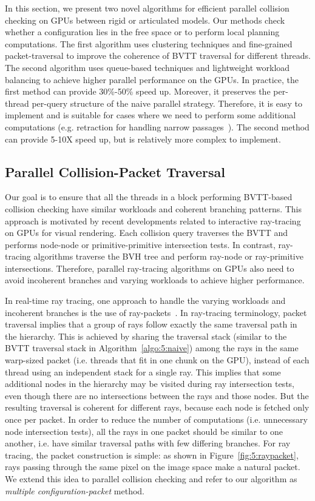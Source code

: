 In this section, we present two novel algorithms for efficient parallel collision checking on GPUs between rigid or articulated models. Our methods check whether a configuration lies in the free space or to perform local planning computations. The first algorithm uses clustering techniques and fine-grained packet-traversal to improve the
coherence of BVTT traversal for different threads. The second algorithm uses queue-based techniques and lightweight workload
balancing to achieve higher parallel performance on the GPUs. In practice, the first method can provide 30\%-50\% speed up.
Moreover, it preserves the per-thread per-query structure of the naive parallel strategy. Therefore, it is easy to implement
and is suitable for cases where we need to perform some additional computations (e.g. retraction for handling narrow passages~\cite{Zhang08-ICRA}). The second method can provide 5-10X speed up, but is relatively more complex to implement.


\subsection{Parallel Collision-Packet Traversal}
\label{sec:5:algorithm:packet}
Our goal is to ensure that all the threads in a block performing BVTT-based collision checking have similar workloads and coherent
branching patterns. This approach is motivated by recent developments related to interactive ray-tracing on GPUs for visual
rendering. Each collision query traverses the BVTT and performs node-node or primitive-primitive intersection tests. In contrast,
ray-tracing algorithms traverse the BVH tree and perform ray-node or ray-primitive intersections. Therefore, parallel ray-tracing
algorithms on GPUs also need to avoid incoherent branches and varying workloads to achieve higher performance.

In real-time ray tracing, one approach to handle the varying workloads and incoherent branches is the
use of ray-packets~\cite{Gunther07,Aila2009}. In ray-tracing terminology, packet traversal implies that a group of
rays follow
exactly the same traversal path in the hierarchy. This is achieved by sharing the traversal stack (similar to the BVTT traversal stack in Algorithm~\ref{algo:5:naive}) among the rays in the same warp-sized packet (i.e. threads that fit in one chunk on the GPU), instead of each thread using an independent stack for a single ray.
This implies that some additional nodes in the hierarchy may be visited during ray intersection tests, even though there are no intersections between the rays and those nodes. But the resulting traversal is coherent for different rays, because each node is fetched only once per packet. In order to reduce the number of computations (i.e. unnecessary node intersection tests), all the rays in one packet should be similar to one another, i.e. have similar traversal paths with few differing branches. For ray tracing, the packet construction is simple: as shown in Figure~\ref{fig:5:raypacket}, rays passing through the same pixel on the image space make a natural packet. We extend this idea to parallel collision checking and refer to our algorithm as \emph{multiple configuration-packet} method.

